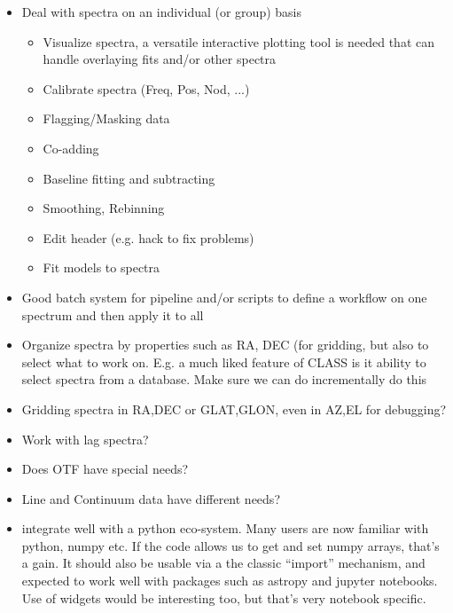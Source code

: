 \documentclass[12pt,a4paper]{article}
\begin{document}
\begin{itemize}

\item Deal with spectra on an individual (or group) basis
  \begin{itemize}
  \item Visualize spectra, a versatile interactive plotting tool is needed
  that can handle overlaying fits and/or other spectra
  \item Calibrate spectra (Freq, Pos, Nod, ...)
  \item Flagging/Masking data
  \item Co-adding
  \item Baseline fitting and subtracting
  \item Smoothing, Rebinning
  \item Edit header (e.g. hack to fix problems)  
  \item Fit models to spectra
  \end{itemize}

\item Good batch system for pipeline and/or scripts to define a workflow on one spectrum
  and then apply it to all
  
\item Organize spectra by properties such as RA, DEC (for gridding,
  but also to select what to work on. E.g. a much liked feature of
  CLASS is it ability to select spectra from a database. Make sure we
  can do incrementally do this

\item Gridding spectra in RA,DEC or GLAT,GLON, even in AZ,EL for debugging?

\item Work with lag spectra?

\item Does OTF have special needs?

\item Line and Continuum data have different needs?  

\item integrate well with a python eco-system. Many users are now familiar with
  python, numpy etc.  If the code allows us to get and set numpy arrays,
  that's a gain. It should also be usable via a the classic ``import''
  mechanism, and expected to work well with packages such as astropy and jupyter
  notebooks. Use of widgets would be interesting too, but that's very notebook
  specific.
\end{itemize}
\end{document}
